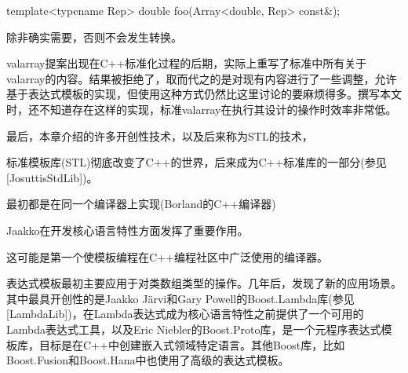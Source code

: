 \begin{cpp}
template<typename Rep>
double foo(Array<double, Rep> const&);
\end{cpp}

除非确实需要，否则不会发生转换。

valarray提案出现在C++标准化过程的后期，实际上重写了标准中所有关于valarray的内容。结果被拒绝了，取而代之的是对现有内容进行了一些调整，允许基于表达式模板的实现，但使用这种方式仍然比这里讨论的要麻烦得多。撰写本文时，还不知道存在这样的实现，标准valarray在执行其设计的操作时效率非常低。

最后，本章介绍的许多开创性技术，以及后来称为STL的技术，

\begin{notice}标准模板库(STL)彻底改变了C++的世界，后来成为C++标准库的一部分(参见[JosuttisStdLib])。
\end{notice}

最初都是在同一个编译器上实现(Borland的C++编译器)

\begin{notice}Jaakko在开发核心语言特性方面发挥了重要作用。
\end{notice}

这可能是第一个使模板编程在C++编程社区中广泛使用的编译器。

表达式模板最初主要应用于对类数组类型的操作。几年后，发现了新的应用场景。其中最具开创性的是Jaakko J{\"a}rvi和Gary Powell的Boost.Lambda库(参见[LambdaLib])，在Lambda表达式成为核心语言特性之前提供了一个可用的Lambda表达式工具，以及Eric Niebler的Boost.Proto库，是一个元程序表达式模板库，目标是在C++中创建嵌入式领域特定语言。其他Boost库，比如Boost.Fusion和Boost.Hana中也使用了高级的表达式模板。



































